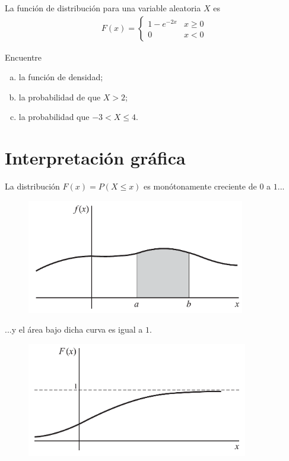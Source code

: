  \begin{ejemplo}
  \label{sol:2.7}
  La función de distribución para una variable aleatoria $X$ es
  \begin{align}
   F(x)=
   \begin{cases}
    1-e^{-2x} & x\geq 0 \\
    0 & x <0
   \end{cases}
  \end{align}

  Encuentre
  \begin{enumerate}[(a)]
   \item la función de densidad;
   \item la probabilidad de que $X>2$;
   \item la probabilidad que $-3 < X \leq 4.$
  \end{enumerate}


 \end{ejemplo}



\section{Interpretación gráfica}


	La distribución $F(x)=P(X\leq x)$ es monótonamente creciente de $0$ a $1...$
	\begin{figure}[h]
	\centering
	\includegraphics[height=5cm,keepaspectratio=true]{./pe/pands0202.png}
\end{figure}




  ...y el área bajo dicha curva es igual a $1.$
  \begin{figure}[h]
	\centering
	\includegraphics[height=5cm,keepaspectratio=true]{./pe/pands0203.png}
\end{figure}




